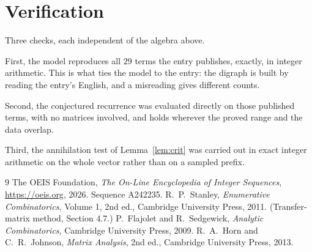 \documentclass[11pt,a4paper]{article}
\theoremstyle{plain}
\theoremstyle{definition}
\begin{document}
\section{Verification}

Three checks, each independent of the algebra above.

First, the model reproduces all $29$ terms the entry publishes, exactly, in integer
arithmetic. This is what ties the model to the entry: the digraph is built by reading the
entry's English, and a misreading gives different counts.

Second, the conjectured recurrence was evaluated directly on those published terms, with no
matrices involved, and holds wherever the proved range and the data overlap.

Third, the annihilation test of Lemma~\ref{lem:crit} was carried out in exact integer
arithmetic on the whole vector rather than on a sampled prefix.

\begin{thebibliography}{9}
 The OEIS Foundation, \emph{The On-Line Encyclopedia of Integer
Sequences}, \url{https://oeis.org}, 2026. Sequence A242235.
 R.~P.~Stanley, \emph{Enumerative Combinatorics}, Volume 1, 2nd ed.,
Cambridge University Press, 2011. (Transfer-matrix method, Section 4.7.)
 P.~Flajolet and R.~Sedgewick, \emph{Analytic Combinatorics}, Cambridge
University Press, 2009.
 R.~A.~Horn and C.~R.~Johnson, \emph{Matrix Analysis}, 2nd ed., Cambridge
University Press, 2013.
\end{thebibliography}
\end{document}
